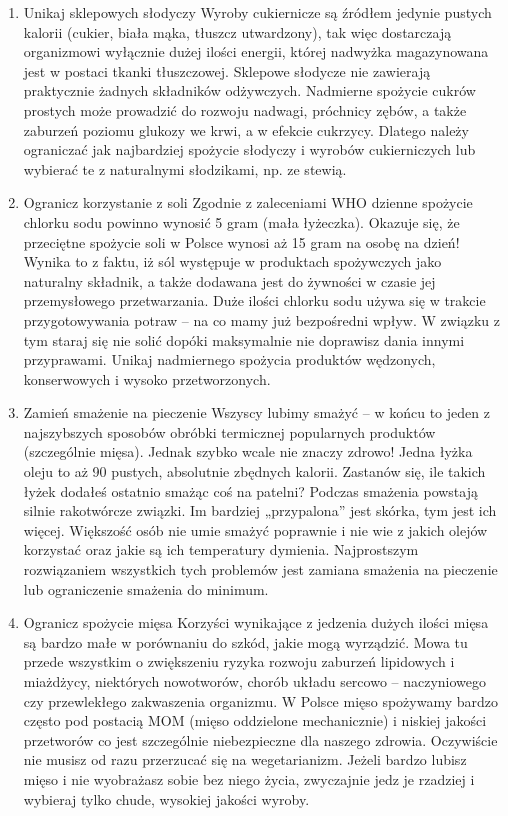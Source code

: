 \documentclass{article}
\begin{document}
\begin{enumerate}
\item Unikaj sklepowych słodyczy \newline
Wyroby cukiernicze są źródłem jedynie pustych kalorii (cukier, biała mąka, tłuszcz utwardzony), tak więc dostarczają organizmowi wyłącznie dużej ilości energii, której nadwyżka magazynowana jest w postaci tkanki tłuszczowej. Sklepowe słodycze nie zawierają praktycznie żadnych składników odżywczych. Nadmierne spożycie cukrów prostych może prowadzić do rozwoju nadwagi, próchnicy zębów, a także zaburzeń poziomu glukozy we krwi, a w efekcie cukrzycy. Dlatego należy ograniczać jak najbardziej spożycie słodyczy i wyrobów cukierniczych lub wybierać te z naturalnymi słodzikami, np. ze stewią.
\item Ogranicz korzystanie z soli \newline
Zgodnie z zaleceniami WHO dzienne spożycie chlorku sodu powinno wynosić 5 gram (mała łyżeczka). Okazuje się, że przeciętne spożycie soli w Polsce wynosi aż 15 gram na osobę na dzień! Wynika to z faktu, iż sól występuje w produktach spożywczych jako naturalny składnik, a także dodawana jest do żywności w czasie jej przemysłowego przetwarzania. Duże ilości chlorku sodu używa się w trakcie przygotowywania potraw – na co mamy już bezpośredni wpływ. W związku z tym staraj się nie solić dopóki maksymalnie nie doprawisz dania innymi przyprawami. Unikaj nadmiernego spożycia produktów wędzonych, konserwowych i wysoko przetworzonych.
\item Zamień smażenie na pieczenie \newline
Wszyscy lubimy smażyć – w końcu to jeden z najszybszych sposobów obróbki termicznej popularnych produktów (szczególnie mięsa). Jednak szybko wcale nie znaczy zdrowo!
Jedna łyżka oleju to aż 90 pustych, absolutnie zbędnych kalorii. Zastanów się, ile takich łyżek dodałeś ostatnio smażąc coś na patelni?
Podczas smażenia powstają silnie rakotwórcze związki. Im bardziej „przypalona” jest skórka, tym jest ich więcej.
Większość osób nie umie smażyć poprawnie i nie wie z jakich olejów korzystać oraz jakie są ich temperatury dymienia.
Najprostszym rozwiązaniem wszystkich tych problemów jest zamiana smażenia na pieczenie lub ograniczenie smażenia do minimum.
\item Ogranicz spożycie mięsa \newline
Korzyści wynikające z jedzenia dużych ilości mięsa są bardzo małe w porównaniu do szkód, jakie mogą wyrządzić. Mowa tu przede wszystkim o zwiększeniu ryzyka rozwoju zaburzeń lipidowych i miażdżycy, niektórych nowotworów, chorób układu sercowo – naczyniowego czy przewlekłego zakwaszenia organizmu. W Polsce mięso spożywamy bardzo często pod postacią MOM (mięso oddzielone mechanicznie) i niskiej jakości przetworów co jest szczególnie niebezpieczne dla naszego zdrowia. Oczywiście nie musisz od razu przerzucać się na wegetarianizm. Jeżeli bardzo lubisz mięso i nie wyobrażasz sobie bez niego życia, zwyczajnie jedz je rzadziej i wybieraj tylko chude, wysokiej jakości wyroby.
\end{enumerate}
\end{document}
